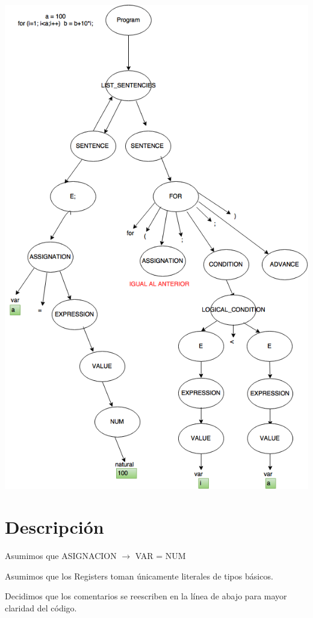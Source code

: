 \documentclass[10pt,a4paper]{article}
\begin{document}
\begin{center}
\includegraphics[scale=0.7]{imgs/ejemploGramatica.png}
\end{center}

\section{Descripción}

Asumimos que ASIGNACION $\rightarrow$ VAR = NUM 

Asumimos que los Registers toman únicamente literales de tipos básicos.

Decidimos que los comentarios se reescriben en la línea de abajo para mayor claridad del código.
\end{document}
